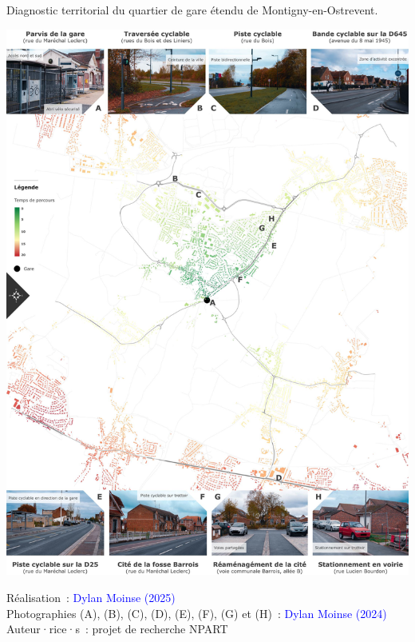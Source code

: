 \begin{refsegment}
    \begin{carte}[h!]\vspace*{4pt}
        \caption{Diagnostic territorial du quartier de gare étendu de Montigny-en-Ostrevent.}
        \label{fig-chap6:monographie-montigny}
        \centerline{\includegraphics[width=1\columnwidth]{src/Figures/Chap-6/FR_NPART_Montigny.jpg}}
        \vspace{5pt}
        \begin{flushright}\scriptsize{
        Réalisation~: \textcolor{blue}{Dylan Moinse (2025)}
        \\
        Photographies (A), (B), (C), (D), (E), (F), (G) et (H)~: \textcolor{blue}{Dylan Moinse (2024)}
        \\
        Auteur·rice·s~: projet de recherche \acrshort{NPART}
        }\end{flushright}
    \end{carte}


\end{refsegment}
